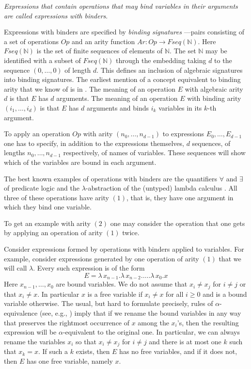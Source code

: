 \documentclass[onecolumn,12pt]{amsart}
\numberwithin{proposition}{subsection}
\newcommand{\sr}{\rightarrow}
\newcommand{\nn}{{\mathbb N}}
\newcommand{\nat}{\nn}
\begin{document}
{\em Expressions that contain operations that may bind variables in their
  arguments are called expressions with binders}.
 
Expressions with binders are specified by {\em binding signatures}%
---pairs consisting of a set of operations $Op$ and an arity function $Ar:Op\sr Fseq(\nat)$.
Here $Fseq(\nat)$ is the set of finite sequences of elements of
$\nat$. The set $\nat$ may be identified with a subset of $Fseq(\nat)$ through the
embedding taking $d$ to the sequence $(0,\dots,0)$ of length $d$. This defines
an inclusion of algebraic signatures into binding signatures. The earliest
mention of a concept equivalent to binding arity that we know of is in
\cite{Aczel1978}. The meaning of an operation $E$ with algebraic arity $d$
is that $E$ has $d$ arguments. The meaning of an operation $E$ with binding
arity $(i_1,\dots,i_d)$ is that $E$ has $d$ arguments and binds $i_k$ variables
in its $k$-th argument.

To apply an operation $Op$ with arity $(n_0,\dots,n_{d-1})$ to expressions
$E_0,\dots,E_{d-1}$ one has to specify, in addition to the expressions
themselves, $d$ sequences, of lengths $n_0,\dots,n_{d-1}$ respectively, of
names of variables. These sequences will show which of the variables are bound
in each argument.

The best known examples of operations with binders are the quantifiers
$\forall$ and $\exists$ of predicate logic and the $\lambda$-abstraction of the
(untyped) lambda calculus \cite{Church1932,Barendregt}. All three of
these operations have arity $(1)$, that is, they have one argument in which
they bind one variable.

To get an example with arity $(2)$ one may consider the operation that one gets by applying an operation of arity $(1)$ twice.

Consider expressions formed by operations with binders applied to
variables. For example, consider expressions generated by one operation of
arity $(1)$ that we will call $\lambda$. Every such expression is of the form
%
$$E=\lambda\,x_{n-1}.\lambda\,x_{n-2}.\dots.\lambda\,x_0.x$$
%
Here $x_{n-1},\dots,x_{0}$ are bound variables.  We do not assume that $x_i\ne x_j$
for $i\ne j$ or that $x_i\ne x$. In particular $x$ is a free variable if
$x_i\ne x$ for all $i\ge 0$ and is a bound variable otherwise. The usual, but hard to
formulate precisely, rules of $\alpha$-equivalence (see, e.g., \cite[Def. 2.1.11,
  p.~26]{Barendregt}) imply that if we rename the bound variables in any way
that preserves the rightmost occurrence of $x$ among the $x_i$'s, then the
resulting expression will be $\alpha$-equivalent to the original one. In
particular, we can always rename the variables $x_i$ so that $x_i\ne x_j$ for $i\ne j$ and
there is at most one $k$ such that $x_k=x$. If such a $k$ exists, then $E$ has
no free variables, and if it does not, then $E$ has one free variable, namely $x$.
\end{document}
